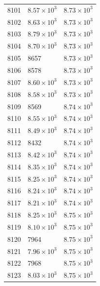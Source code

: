 \begin{table}[H]
\begin{tabular}{lll}
8101 & $\displaystyle 8.57 \times 10^{3}$ & $\displaystyle 8.73 \times 10^{3}$ \\
8102 & $\displaystyle 8.63 \times 10^{3}$ & $\displaystyle 8.73 \times 10^{3}$ \\
8103 & $\displaystyle 8.79 \times 10^{3}$ & $\displaystyle 8.73 \times 10^{3}$ \\
8104 & $\displaystyle 8.70 \times 10^{3}$ & $\displaystyle 8.73 \times 10^{3}$ \\
8105 & 8657 & $\displaystyle 8.73 \times 10^{3}$ \\
8106 & 8578 & $\displaystyle 8.73 \times 10^{3}$ \\
8107 & $\displaystyle 8.60 \times 10^{3}$ & $\displaystyle 8.73 \times 10^{3}$ \\
8108 & $\displaystyle 8.58 \times 10^{3}$ & $\displaystyle 8.73 \times 10^{3}$ \\
8109 & 8569 & $\displaystyle 8.74 \times 10^{3}$ \\
8110 & $\displaystyle 8.55 \times 10^{3}$ & $\displaystyle 8.74 \times 10^{3}$ \\
8111 & $\displaystyle 8.49 \times 10^{3}$ & $\displaystyle 8.74 \times 10^{3}$ \\
8112 & 8432 & $\displaystyle 8.74 \times 10^{3}$ \\
8113 & $\displaystyle 8.42 \times 10^{3}$ & $\displaystyle 8.74 \times 10^{3}$ \\
8114 & $\displaystyle 8.35 \times 10^{3}$ & $\displaystyle 8.74 \times 10^{3}$ \\
8115 & $\displaystyle 8.25 \times 10^{3}$ & $\displaystyle 8.74 \times 10^{3}$ \\
8116 & $\displaystyle 8.24 \times 10^{3}$ & $\displaystyle 8.74 \times 10^{3}$ \\
8117 & $\displaystyle 8.21 \times 10^{3}$ & $\displaystyle 8.74 \times 10^{3}$ \\
8118 & $\displaystyle 8.25 \times 10^{3}$ & $\displaystyle 8.75 \times 10^{3}$ \\
8119 & $\displaystyle 8.10 \times 10^{3}$ & $\displaystyle 8.75 \times 10^{3}$ \\
8120 & 7964 & $\displaystyle 8.75 \times 10^{3}$ \\
8121 & $\displaystyle 7.96 \times 10^{3}$ & $\displaystyle 8.75 \times 10^{3}$ \\
8122 & 7968 & $\displaystyle 8.75 \times 10^{3}$ \\
8123 & $\displaystyle 8.03 \times 10^{3}$ & $\displaystyle 8.75 \times 10^{3}$ \\

\end{tabular}
\end{table}
